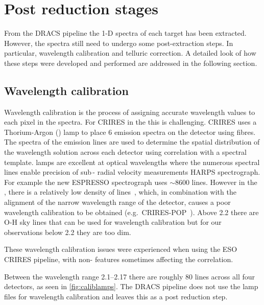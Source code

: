 

\section{Post reduction stages}
\label{sec:posreduction}
From the {DRACS} pipeline the 1-D spectra of each target has been extracted.
However, the spectra still need to undergo some post-extraction steps.
In particular, wavelength calibration and telluric correction.
A detailed look of how these steps were developed and performed are addressed in the following section.

\subsection{Wavelength calibration}
\label{subsec:wavecalib}

Wavelength calibration is the process of assigning accurate wavelength values to each pixel in the spectra.
For {CRIRES} in the \nir{} this is challenging.
{CRIRES} uses a Thorium-Argon (\thar) lamp to place 6 emission spectra on the detector using fibres.
The spectra of the \thar{} emission lines are used to determine the spatial distribution of the wavelength solution across each detector using correlation with a spectral template.
\thar{} lamps are excellent at optical wavelengths where the numerous spectral lines enable precision of sub\,-\mps{} radial velocity measurements {HARPS} spectrograph.
For example the new ESPRESSO spectrograph uses \(\sim8600\) \thar{} lines.
However in the \nir{}, there is a relatively low density of \thar{} lines~\citep{kerber_laboratory_2009}, which, in combination with the alignment of the narrow wavelength range of the detector, causes a poor wavelength calibration to be obtained (e.g.\ {CRIRES}-POP~\citep{nicholls_crirespop_2017}).
Above 2.2\um{} there are {O-H} sky lines that can be used for wavelength calibration but for our observations below 2.2\um{} they are too dim.

These wavelength calibration issues were experienced when using the {ESO} {CRIRES} pipeline, with non-\thar{} features sometimes affecting the correlation.

Between the wavelength range 2.1--2.17\um{} there are roughly 80 \thar{} lines across all four detectors, as seen in \cref{fig:caliblamps}.
The {DRACS} pipeline does not use the \thar{} lamp files for wavelength calibration and leaves this as a post reduction step.

